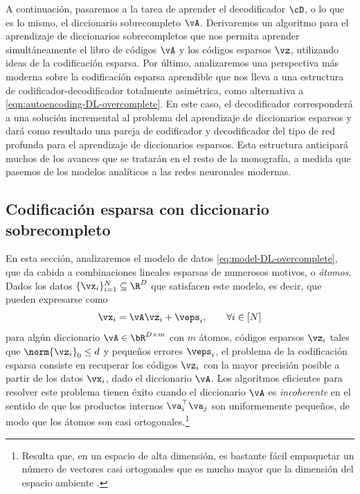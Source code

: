 \documentclass[../../book-main.tex]{subfiles}
\begin{document}
A continuación, pasaremos a la tarea de aprender el decodificador $\cD$, o
lo que es lo mismo, el diccionario sobrecompleto $\vA$.
Derivaremos un algoritmo para el aprendizaje de diccionarios sobrecompletos que nos permita
aprender simultáneamente el libro de códigos $\vA$ y los códigos esparsos
$\vz$, utilizando ideas de la codificación esparsa.
Por último, analizaremos una perspectiva más moderna sobre la codificación
esparsa aprendible que nos lleva a una estructura de codificador-decodificador
totalmente asimétrica, como alternativa a \eqref{eqn:autoencoding-DL-overcomplete}.
En este caso, el decodificador corresponderá a una solución incremental al
problema del aprendizaje de diccionarios esparsos y dará como resultado una pareja de
codificador y decodificador del tipo de red profunda para el aprendizaje de 
diccionarios esparsos. Esta estructura anticipará muchos de los avances que se 
tratarán en el resto de la monografía, a medida que pasemos de los modelos 
analíticos a las redes neuronales modernas.

\subsection{Codificación esparsa con diccionario sobrecompleto}

En esta sección, analizaremos el modelo de datos
\eqref{eq:model-DL-overcomplete}, que da cabida a combinaciones lineales esparsas
de numerosos motivos, o \textit{átomos}. Dados los datos \(\{\vx_{i}\}_{i =
    1}^{N} \subseteq
\R^{D}\) que satisfacen este modelo, es decir, que pueden expresarse como
\begin{equation}\label{eq:vectorized_sparse_dl_dgp}
    \vx_{i} = \vA\vz_{i} + \veps_{i}, \qquad \forall i \in [N]
\end{equation}
para algún diccionario $\vA \in \bR^{D \times m}$ con $m$ átomos, códigos esparsos
$\vz_i$ tales que $\norm{\vz_i}_0 \leq d$ y pequeños errores $\veps_i$,
el problema de la codificación esparsa consiste en recuperar los códigos $\vz_i$ con la mayor precisión
posible a partir de los datos $\vx_i$, dado el diccionario $\vA$.
Los algoritmos eficientes para resolver este problema tienen éxito cuando
el diccionario \(\vA\) es \textit{incoherente} en el sentido de que los
productos internos \(\va_{i}^{\top}\va_{j}\) son uniformemente pequeños, de modo que los átomos son
casi ortogonales.\footnote{Resulta que, en un espacio de alta dimensión, es
    bastante fácil empaquetar un número de vectores casi ortogonales que es
    mucho mayor
que la dimensión del espacio ambiente \cite{Wright-Ma-2022}.}
\end{document}
